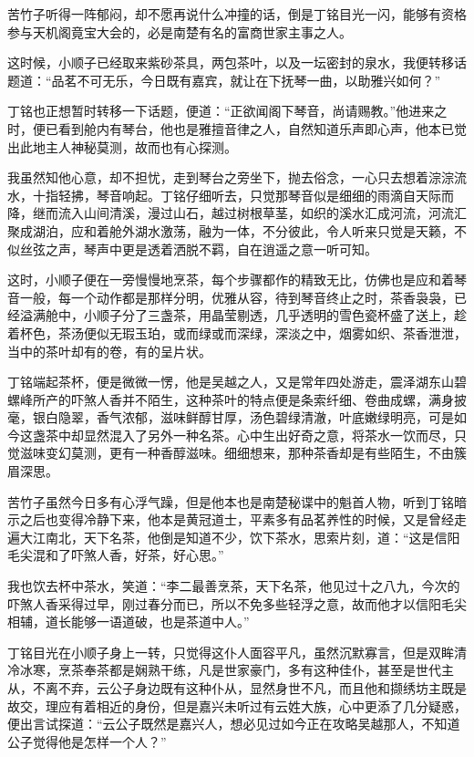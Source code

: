 苦竹子听得一阵郁闷，却不愿再说什么冲撞的话，倒是丁铭目光一闪，能够有资格参与天机阁竟宝大会的，必是南楚有名的富商世家主事之人。

这时候，小顺子已经取来紫砂茶具，两包茶叶，以及一坛密封的泉水，我便转移话题道：“品茗不可无乐，今日既有嘉宾，就让在下抚琴一曲，以助雅兴如何？”

丁铭也正想暂时转移一下话题，便道：“正欲闻阁下琴音，尚请赐教。”他进来之时，便已看到舱内有琴台，他也是雅擅音律之人，自然知道乐声即心声，他本已觉出此地主人神秘莫测，故而也有心探测。

我虽然知他心意，却不担忧，走到琴台之旁坐下，抛去俗念，一心只去想着淙淙流水，十指轻拂，琴音响起。丁铭仔细听去，只觉那琴音似是细细的雨滴自天际而降，继而流入山间清溪，漫过山石，越过树根草茎，如织的溪水汇成河流，河流汇聚成湖泊，应和着舱外湖水激荡，融为一体，不分彼此，令人听来只觉是天籁，不似丝弦之声，琴声中更是透着洒脱不羁，自在逍遥之意一听可知。

这时，小顺子便在一旁慢慢地烹茶，每个步骤都作的精致无比，仿佛也是应和着琴音一般，每一个动作都是那样分明，优雅从容，待到琴音终止之时，茶香袅袅，已经溢满舱中，小顺子分了三盏茶，用晶莹剔透，几乎透明的雪色瓷杯盛了送上，趁着杯色，茶汤便似无瑕玉珀，或而绿或而深绿，深淡之中，烟雾如织、茶香泄泄，当中的茶叶却有的卷，有的呈片状。

丁铭端起茶杯，便是微微一愣，他是吴越之人，又是常年四处游走，震泽湖东山碧螺峰所产的吓煞人香并不陌生，这种茶叶的特点便是条索纤细、卷曲成螺，满身披毫，银白隐翠，香气浓郁，滋味鲜醇甘厚，汤色碧绿清澈，叶底嫩绿明亮，可是如今这盏茶中却显然混入了另外一种名茶。心中生出好奇之意，将茶水一饮而尽，只觉滋味变幻莫测，更有一种香醇滋味。细细想来，那种茶香却是有些陌生，不由簇眉深思。

苦竹子虽然今日多有心浮气躁，但是他本也是南楚秘谍中的魁首人物，听到丁铭暗示之后也变得冷静下来，他本是黄冠道士，平素多有品茗养性的时候，又是曾经走遍大江南北，天下名茶，他倒是知道不少，饮下茶水，思索片刻，道：“这是信阳毛尖混和了吓煞人香，好茶，好心思。”

我也饮去杯中茶水，笑道：“李二最善烹茶，天下名茶，他见过十之八九，今次的吓煞人香采得过早，刚过春分而已，所以不免多些轻浮之意，故而他才以信阳毛尖相辅，道长能够一语道破，也是茶道中人。”

丁铭目光在小顺子身上一转，只觉得这仆人面容平凡，虽然沉默寡言，但是双眸清冷冰寒，烹茶奉茶都是娴熟干练，凡是世家豪门，多有这种佳仆，甚至是世代主从，不离不弃，云公子身边既有这种仆从，显然身世不凡，而且他和撷绣坊主既是故交，理应有着相近的身份，但是嘉兴未听过有云姓大族，心中更添了几分疑惑，便出言试探道：“云公子既然是嘉兴人，想必见过如今正在攻略吴越那人，不知道公子觉得他是怎样一个人？”

